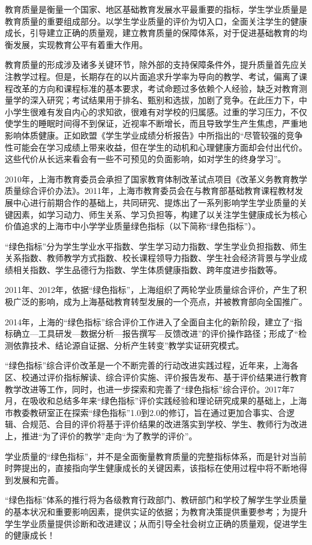 \myprefacetext

教育质量是衡量一个国家、地区基础教育发展水平最重要的指标，学生学业质量是教育质量的重要组成部分。以学生学业质量的评价为切入口，全面关注学生的健康成长，引导建立正确的质量观，建立教育质量的保障体系，对于促进基础教育的均衡发展，实现教育公平有着重大作用。

教育质量的形成涉及诸多关键环节，除外部的支持保障条件外，提升质量首先应关注教学过程。但是，长期存在的以片面追求升学率为导向的教学、考试，偏离了课程改革的方向和课程标准的基本要求，考试命题过多依赖个人经验，缺乏对教育测量学的深入研究；考试结果用于排名、甄别和选拔，加剧了竞争。在此压力下，中小学生很难有发自内心的求知欲，很难有对学校的归属感。过重的学习压力，不仅使学生的睡眠时间得不到保证，近视率不断增长，而且导致学生产生焦虑，严重地影响体质健康。正如欧盟《学生学业成绩分析报告》中所指出的“尽管较强的竞争性可能会在学习成绩上带来收益，但在学生的动机和心理健康方面却会付出代价。这些代价从长远来看会有一些不可预见的负面影响，如对学生的终身学习”。

2010年，上海市教育委员会承担了国家教育体制改革试点项目《改革义务教育教学质量综合评价办法》。2011年，上海市教育委员会在与教育部基础教育课程教材发展中心进行前期合作的基础上，共同研究、提炼出了一系列影响学生学业质量的关键因素，如学习动力、师生关系、学习负担等，构建了以关注学生健康成长为核心价值追求的上海市中小学学业质量绿色指标（以下简称“绿色指标”）。


“绿色指标”分为学生学业水平指数、学生学习动力指数、学生学业负担指数、师生关系指数、教师教学方式指数、校长课程领导力指数、学生社会经济背景与学业成绩相关指数、学生品德行为指数、学生体质健康指数、跨年度进步指数等。


2011年、2012年，依据“绿色指标”，上海组织了两轮学业质量综合评价，产生了积极广泛的影响，成为上海基础教育转型发展的一个亮点，并被教育部向全国推广。


2014年，上海的“绿色指标”综合评价工作进入了全面自主化的新阶段，建立了“指标确立—工具研发—数据分析—报告撰写—反馈改进”的评价操作路径；形成了“检测依靠技术、结论源自证据、分析产生转变”教学实证研究模式。


“绿色指标”综合评价改革是一个不断完善的行动改进实践过程，近年来，上海各区、校通过评价指标解读、综合评价实施、评价报告发布、基于评价结果进行教育教学改进等工作，同时，也进一步探索和完善了“绿色指标”综合评价。2017年7月，在吸收和总结多年来“绿色指标”评价实践经验和理论研究成果的基础上，上海市教委教研室正在探索“绿色指标”1.0到2.0的修订，旨在通过更加合事实、合逻辑、合规范、合目的评价将基于评价结果的改进落实到学校、学生、教师行为改进上，推进“为了评价的教学”走向“为了教学的评价”。


学业质量的“绿色指标”，并不是全面衡量教育质量的完整指标体系，而是针对当前时弊提出的，直接指向学生健康成长的关键因素，该指标在使用过程中将不断地得到发展和完善。


“绿色指标”体系的推行将为各级教育行政部门、教研部门和学校了解学生学业质量的基本状况和重要影响因素，提供实证的依据；为教育决策提供重要参考；为提升学生学业质量提供诊断和改进建议；从而引导全社会树立正确的质量观，促进学生的健康成长！

\clearpage
